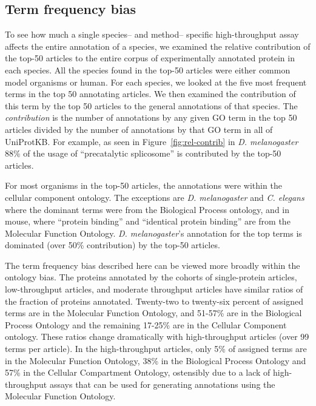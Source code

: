 \documentclass[12pt]{article}
\begin{document}
\subsection*{Term frequency bias}
To see how much a single species-- and method-- specific high-throughput assay affects the entire
annotation of a species, we examined the relative contribution of the top-50 articles to the entire
corpus of experimentally annotated protein in each species.  All the species found in the top-50
articles were either common
model organisms or human.
For each species, we looked at the five most frequent terms in the top 50 annotating articles. We then
examined the contribution of this term by the top 50 articles to the general annotations of that
species.  The \textit{contribution} is the number of annotations by any given GO term in the top 50
articles divided by the number of annotations by that GO term in all of UniProtKB.  For example, as
seen in Figure~\ref{fig:rel-contrib} in \textit{D.  melanogaster} 88\% of the usage of
``precatalytic splicosome'' is contributed by the top-50 articles. 


For most organisms in the top-50 articles,  the annotations were within the cellular component
ontology. The exceptions are \textit{D. melanogaster} and \textit{C. elegans} where the
dominant terms were from the Biological Process ontology, and in mouse, where ``protein
binding'' and ``identical protein binding'' are from the Molecular Function Ontology.
\textit{D. melanogaster}'s annotation for the top terms is dominated (over 50\% contribution)
by the top-50 articles. 

The term frequency bias described here can be viewed more broadly within the ontology bias. The
proteins annotated by the cohorts of single-protein articles, low-throughput articles, and moderate throughput
articles have similar ratios of the fraction of proteins annotated.  Twenty-two to twenty-six
percent of assigned terms are in the Molecular Function Ontology, and 51-57\% are in the
Biological Process Ontology and the remaining 17-25\% are in the Cellular Component ontology.
These ratios change dramatically with high-throughput articles (over 99 terms per article). In the
high-throughput articles, only 5\% of assigned terms are in the Molecular Function Ontology, 38\%
in the Biological Process Ontology and 57\% in the Cellular Compartment Ontology, ostensibly due
to a lack of high-throughput assays that can be used for generating annotations using the
Molecular Function Ontology. 
\end{document}
